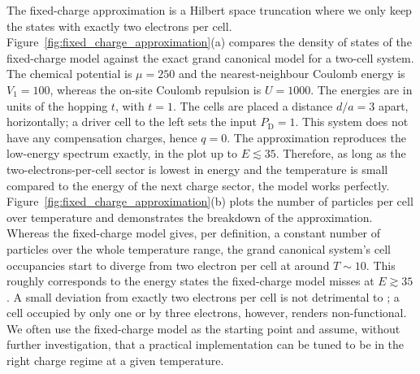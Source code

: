 The fixed-charge approximation is a Hilbert space truncation where we only keep
the states with exactly two electrons per cell.
Figure~\ref{fig:fixed_charge_approximation}(a) compares the density of states of
the fixed-charge model against the exact grand canonical model for a two-cell
system. The chemical potential is $\mu = 250$ and the nearest-neighbour Coulomb
energy is $V_1 = 100$, whereas the on-site Coulomb repulsion is $U = 1000$. The
energies are in units of the hopping $t$, with $t = 1$. The cells are placed a
distance $d/a = 3$ apart, horizontally; a driver cell to the left sets the input
$P_\text{D} = 1$. This system does not have any
compensation charges, hence $q = 0$. The approximation reproduces the low-energy
spectrum exactly, in the plot up to $E \lesssim 35$. Therefore, as long as the
two-electrons-per-cell sector is lowest in energy and the temperature is small
compared to the energy of the next charge sector, the model works perfectly.
Figure~\ref{fig:fixed_charge_approximation}(b) plots the number of particles per
cell over temperature and demonstrates the breakdown of the approximation.
Whereas the fixed-charge model gives, per definition, a constant number of
particles over the whole temperature range, the grand canonical system's cell
occupancies start to diverge from two electron per cell at around $T \sim 10$.
This roughly corresponds to the energy states the fixed-charge model misses at
$E \gtrsim 35$. A small deviation from exactly two electrons per cell is not
detrimental to ; a cell occupied by only one or by three electrons,
however, renders  non-functional. We often use the fixed-charge model
as the starting point and assume, without further investigation, that a
practical  implementation can be tuned to be in the right charge
regime at a given temperature.

